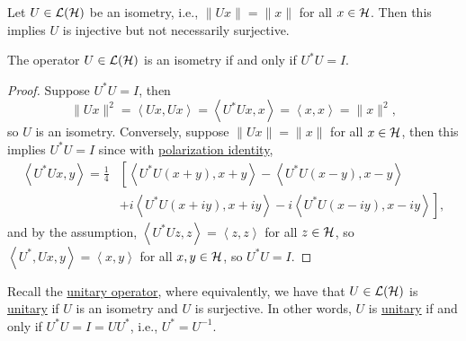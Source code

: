 Let \(U\in \mathcal{\MakeUppercase{l}} (\mathcal{\MakeUppercase{h}} )\) be an isometry, i.e., \(\lVert Ux \rVert = \lVert x \rVert \) for all \(x\in \mathcal{\MakeUppercase{h}} \). Then this implies \(U\) is injective but not necessarily surjective.

\begin{lemma}
	The operator \(U\in \mathcal{\MakeUppercase{l}} (\mathcal{\MakeUppercase{h}} )\) is an isometry if and only if \(U^{\ast} U = I\).
\end{lemma}
\begin{proof}
	Suppose \(U^{\ast} U = I\), then
	\[
		\lVert Ux \rVert ^2
		= \left\langle Ux, Ux \right\rangle
		= \left\langle U^{\ast} Ux, x \right\rangle
		= \left\langle x, x \right\rangle
		= \lVert x \rVert ^2,
	\]
	so \(U\) is an isometry. Conversely, suppose \(\lVert Ux \rVert = \lVert x \rVert \) for all \(x\in \mathcal{\MakeUppercase{h}} \), then this implies \(U^{\ast} U = I\) since with \hyperref[lma:polarization-identity]{polarization identity},
	\[
		\begin{split}
			\left\langle U^{\ast} Ux, y \right\rangle
			= \frac{1}{4} &\left[ \left\langle U^{\ast} U(x+y), x+y \right\rangle - \left\langle U^{\ast} U(x-y), x-y \right\rangle \right.\\
				&+ \left. i\left\langle U^{\ast} U(x+iy), x+iy \right\rangle - i\left\langle U^{\ast} U(x-iy), x-iy \right\rangle \right],
		\end{split}
	\]
	and by the assumption, \(\left\langle U^{\ast} Uz, z \right\rangle = \left\langle z, z \right\rangle \) for all \(z\in \mathcal{\MakeUppercase{h}} \), so \(\left\langle U^{\ast} , Ux, y \right\rangle = \left\langle x, y \right\rangle \) for all \(x, y\in \mathcal{\MakeUppercase{h}} \), so \(U^{\ast} U = I\).
\end{proof}

Recall the \hyperref[def:unitary-op]{unitary operator}, where equivalently, we have that \(U\in \mathcal{\MakeUppercase{l}} (\mathcal{\MakeUppercase{h}} )\) is \hyperref[def:unitary-op]{unitary} if \(U\) is an isometry and \(U\) is surjective. In other words, \(U\) is \hyperref[def:unitary-op]{unitary} if and only if \(U^{\ast} U = I = U U^{\ast} \), i.e., \(U^{\ast} = U ^{-1} \).

